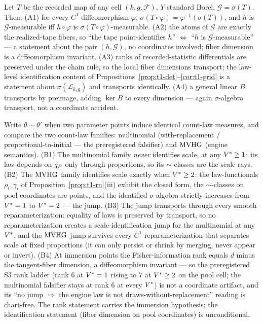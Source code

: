 \begin{proposition}
\label{prop:t1-pronga}
Let $T$ be the recorded map of any cell $(k, g, \mathcal{F})$, $Y$ standard
Borel, $\mathcal{G} = \sigma(T)$. Then: (A1) for every $C^1$ diffeomorphism
$\varphi$, $\sigma(T \circ \varphi) = \varphi^{-1}(\sigma(T))$, and
$h$ is $\mathcal{G}$-measurable iff $h \circ \varphi$ is
$\sigma(T \circ \varphi)$-measurable. (A2) the atoms of $\mathcal{G}$ are
exactly the realized-tape fibers, so ``the tape point-identifies $h$''
$\Leftrightarrow$ ``$h$ is $\mathcal{G}$-measurable'' --- a statement about
the pair $(h, \mathcal{G})$, no coordinates involved; fiber dimension is a
diffeomorphism invariant. (A3) ranks of recorded-statistic differentials are
preserved under the chain rule, so the local fiber dimensions transport;
the law-level identification content of
Propositions~\ref{prop:t1-det}--\ref{cor:t1-grid} is a statement about
$\sigma(\mathcal{L}_{k,g})$ and transports identically. (A4) a general
linear $B$ transports by preimage, adding $\ker B$ to every dimension ---
again $\sigma$-algebra transport, not a coordinate accident.
\end{proposition}


\begin{proposition}
\label{prop:t1-prongb}
Write $\theta \sim \theta'$ when two parameter points induce identical
count-law measures, and compare the two count-law families: multinomial
(with-replacement / proportional-to-initial --- the preregistered
falsifier) and $\operatorname{MVHG}$ (engine semantics). (B1) The multinomial family
\emph{never} identifies scale, at any $V^{*} \geq 1$: its law depends on
$q_{P}$ only through proportions, so its $\sim$-classes are the scale rays.
(B2) The $\operatorname{MVHG}$ family identifies scale exactly when $V^{*} \geq 2$: the
law-functionals $\rho_i, \gamma_i$ of Proposition~\ref{prop:t1-ru}(iii)
exhibit the closed form, the $\sim$-classes on pool coordinates are points,
and the identified $\sigma$-algebra strictly increases from $V^{*} = 1$ to
$V^{*} = 2$ --- the jump. (B3) The jump transports through every smooth
reparameterization: equality of laws is preserved by transport, so no
reparameterization creates a scale-identification jump for the multinomial
at any $V^{*}$, and the $\operatorname{MVHG}$ jump survives every $C^1$ reparameterization
that separates scale at fixed proportions (it can only persist or shrink by
merging, never appear or invert). (B4) At immersion points the Fisher-information rank equals $d$ minus the tangent-fiber dimension, a
diffeomorphism invariant --- so the preregistered S3 rank ladder (rank $6$
at $V^{*} = 1$ rising to $7$ at $V^{*} \geq 2$ on the pool cell; the
multinomial falsifier stays at rank $6$ at every $V^{*}$) is not a
coordinate artifact, and its ``no jump $\Rightarrow$ the engine law is not
draws-without-replacement'' reading is chart-free. The rank statement
carries the immersion hypothesis; the identification statement (fiber
dimension on pool coordinates) is unconditional.
\end{proposition}

